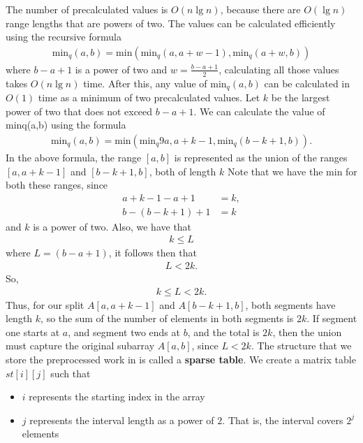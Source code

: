 \documentclass{report}
\begin{document}
    \bigbreak \noindent 
    The number of precalculated values is $O(n\lg n)$, because there are $O(\lg n)$ range lengths that are powers of two. The values can be calculated efficiently using the recursive formula
    \begin{align*}
        \text{min}_{q}(a,b) = \text{min}(\text{min}_{q}(a, a+w-1), \text{min}_{q}(a+w,b))
    \end{align*}
    where $b-a+1$ is a power of two and $w = \frac{b-a+1}{2} $, calculating all those values takes $O(n\lg n)$ time.
    \bigbreak \noindent 
    After this, any value of $\text{min}_{q}(a,b)$ can be calculated in $O(1)$ time as a minimum of two precalculated values. Let $k$ be the largest power of two that does not exceed $b - a+1$. We can calculate the value of minq(a,b) using the formula
    \begin{align*}
        \text{min}_{q}(a,b) = \text{min}(\text{min}_{q}9a,a+k-1, \text{min}_{q}(b-k+1,b))
    .\end{align*}
    In the above formula, the range $[a,b]$ is represented as the union of the ranges $[a,a+ k -1]$ and $[b - k +1,b]$, both of length $k$
    \bigbreak \noindent 
    Note that we have the min for both these ranges, since
    \begin{align*}
        a+k-1-a+1 &= k, \\
        b-(b-k+1)+1 &= k
    \end{align*}
    and $k$ is a power of two. Also, we have that
    \begin{align*}
        k \leq L
    \end{align*}
    where $L = (b-a+1)$, it follows then that
    \begin{align*}
        L < 2k
    .\end{align*}
    So, 
    \begin{align*}
        k \leq L < 2k
    .\end{align*}
    Thus, for our split $A[a,a+k-1]$ and $A[b-k+1,b]$, both segments have length $k$, so the sum of the number of elements in both segments is $2k$. If segment one starts at $a$, and segment two ends at $b$, and the total is $2k$, then the union must capture the original subarray $A[a,b]$, since $ L < 2k $.
    \bigbreak \noindent 
    The structure that we store the preprocessed work in is called a \textbf{sparse table}.
    \bigbreak \noindent 
    We create a matrix table $st[i][j]$ such that 
    \begin{itemize}
        \item $i$ represents the starting index in the array
        \item $j$ represents the interval length as a power of $2$. That is, the interval covers $2^{j}$ elements
    \end{itemize}
\end{document}
